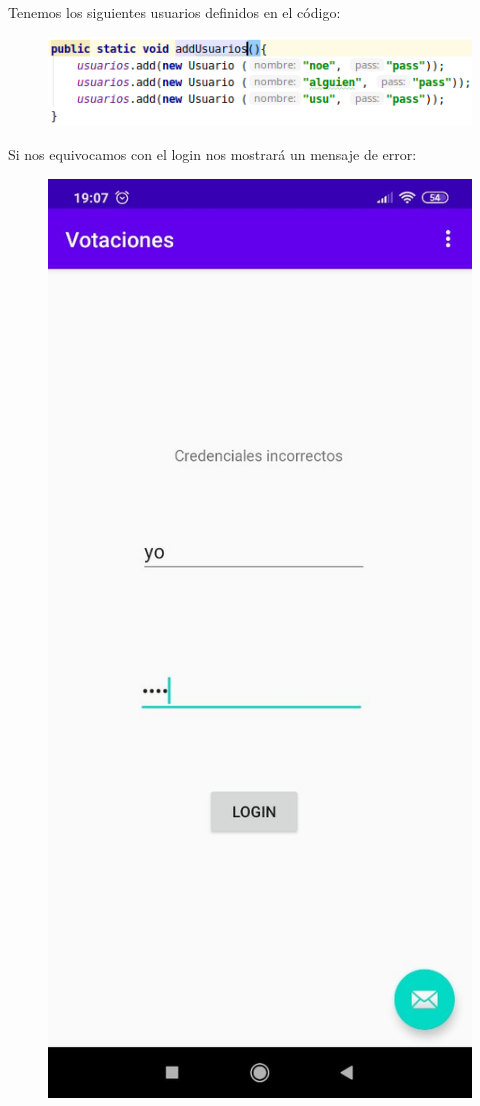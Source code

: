 \documentclass{article}
\begin{document}
 	Tenemos los siguientes usuarios definidos en el código:
 	\begin{figure}[H]
 		\centering
 		\includegraphics[totalheight=2.5cm]{img/android2}
 	\end{figure}
 	Si nos equivocamos con el login nos mostrará un mensaje de error:
 	\begin{figure}[H]
 		\centering
 		\includegraphics[totalheight=8cm]{img/android3}
 	\end{figure}
\end{document}
